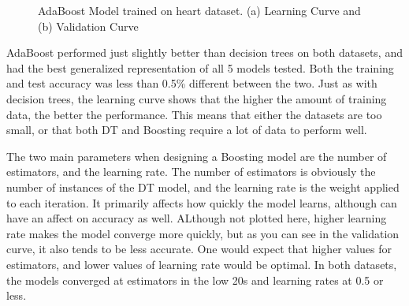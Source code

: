 \documentclass[
	letterpaper, %
]{mlreport}
\begin{document}
\begin{figure}
	\centering
	\caption{AdaBoost Model trained on heart dataset. (a) Learning Curve and (b) Validation Curve}
	\label{fig:fig6}
\end{figure}

AdaBoost performed just slightly better than decision trees on both datasets, and had the best generalized representation of all 5 models tested. Both the training and test accuracy was less than 0.5\% different between the two. Just as with decision trees, the learning curve shows that the higher the amount of training data, the better the performance. This means that either the datasets are too small, or that both DT and Boosting require a lot of data to perform well.

The two main parameters when designing a Boosting model are the number of estimators, and the learning rate. The number of estimators is obviously the number of instances of the DT model, and the learning rate is the weight applied to each iteration. It primarily affects how quickly the model learns, although can have an affect on accuracy as well. ALthough not plotted here, higher learning rate makes the model converge more quickly, but as you can see in the validation curve, it also tends to be less accurate. One would expect that higher values for estimators, and lower values of learning rate would be optimal. In both datasets, the models converged at estimators in the low 20s and learning rates at 0.5 or less.
\end{document}
